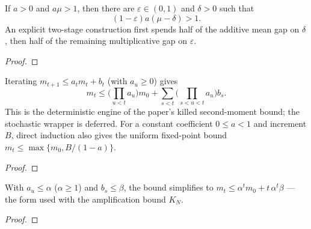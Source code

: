 \begin{lemma}
  \label{lem:strict-product-gap}
  \leanok
  If $a>0$ and $a\mu>1$, then there are
  $\varepsilon\in(0,1)$ and $\delta>0$ such that
  \[
    (1-\varepsilon)a(\mu-\delta)>1.
  \]
  An explicit two-stage construction first spends half of the additive
  mean gap on $\delta$, then half of the remaining multiplicative gap on
  $\varepsilon$.
\end{lemma}
\begin{proof}\leanok\end{proof}

\begin{lemma}
  \label{lem:geom-recursion}
  \leanok
  Iterating $m_{t+1} \le a_t m_t + b_t$ (with $a_u \ge 0$) gives
  \[ m_t \le \Big(\textstyle\prod_{u<t} a_u\Big) m_0
      + \sum_{s<t}\Big(\textstyle\prod_{s<u<t} a_u\Big) b_s. \]
  This is the deterministic engine of the paper's killed second-moment bound;
  the stochastic wrapper is deferred. For a constant
  coefficient $0\le a<1$ and increment $B$, direct induction also gives the
  uniform fixed-point bound
  $m_t\le\max\{m_0,B/(1-a)\}$.
\end{lemma}
\begin{proof}\leanok\end{proof}

\begin{lemma}
  \label{lem:geom-recursion-const}
  \leanok
  With $a_u \le \alpha$ ($\alpha\ge1$) and $b_s \le \beta$, the bound simplifies to
  $m_t \le \alpha^t m_0 + t\,\alpha^t\beta$ — the form used with the amplification
  bound $K_N$.
\end{lemma}
\begin{proof}\leanok{}\end{proof}

